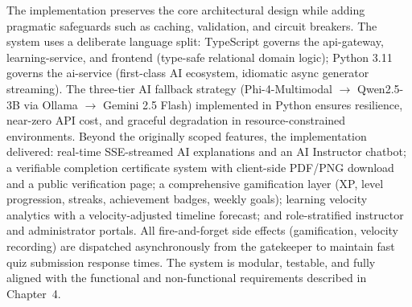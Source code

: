 The implementation preserves the core architectural design while adding pragmatic safeguards such as caching, validation, and circuit breakers. The system uses a deliberate language split: TypeScript governs the api-gateway, learning-service, and frontend (type-safe relational domain logic); Python 3.11 governs the ai-service (first-class AI ecosystem, idiomatic async generator streaming). The three-tier AI fallback strategy (Phi-4-Multimodal $\rightarrow$ Qwen2.5-3B via Ollama $\rightarrow$ Gemini 2.5 Flash) implemented in Python ensures resilience, near-zero API cost, and graceful degradation in resource-constrained environments. Beyond the originally scoped features, the implementation delivered: real-time SSE-streamed AI explanations and an AI Instructor chatbot; a verifiable completion certificate system with client-side PDF/PNG download and a public verification page; a comprehensive gamification layer (XP, level progression, streaks, achievement badges, weekly goals); learning velocity analytics with a velocity-adjusted timeline forecast; and role-stratified instructor and administrator portals. All fire-and-forget side effects (gamification, velocity recording) are dispatched asynchronously from the gatekeeper to maintain fast quiz submission response times. The system is modular, testable, and fully aligned with the functional and non-functional requirements described in Chapter~4.

\endinput
